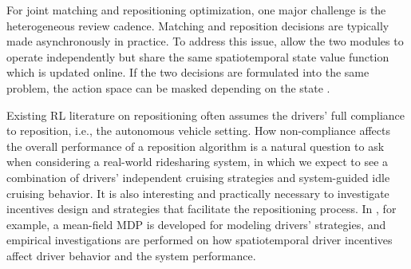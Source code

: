 \documentclass{article}
\begin{document}
For joint matching and repositioning optimization, one major challenge is the heterogeneous review cadence. Matching and reposition decisions are typically made asynchronously in practice. To address this issue, \cite{tang2021value} allow the two modules to operate independently but share the same spatiotemporal state value function which is updated online. If the two decisions are formulated into the same problem, the action space can be masked depending on the state \citep{holler2019deep}. 

Existing RL literature on repositioning often assumes the drivers' full compliance to reposition, i.e., the autonomous vehicle setting. How non-compliance affects the overall performance of a reposition algorithm is a natural question to ask when considering a real-world ridesharing system, in which we expect to see a combination of drivers' independent cruising strategies \citep{urata2021learning,wong2014cell} and system-guided idle cruising behavior. It is also interesting and practically necessary to investigate incentives design and strategies that facilitate the repositioning process. In \citep{zhu2021mean}, for example, a mean-field MDP is developed for modeling drivers' strategies, and empirical investigations are performed on how spatiotemporal driver incentives affect driver behavior and the system performance.
\end{document}
